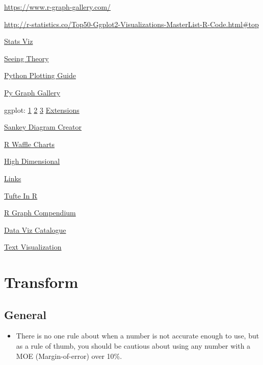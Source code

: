 \documentclass[]{book}
\providecommand{\tightlist}{%
  \setlength{\itemsep}{0pt}\setlength{\parskip}{0pt}}
\begin{document}
\url{https://www.r-graph-gallery.com/}

\url{http://r-statistics.co/Top50-Ggplot2-Visualizations-MasterList-R-Code.html\#top}

\href{http://emilkirkegaard.dk/understanding_statistics/}{Stats Viz}

\href{http://students.brown.edu/seeing-theory/}{Seeing Theory}

\href{http://pythonplot.com/}{Python Plotting Guide}

\href{https://python-graph-gallery.com}{Py Graph Gallery}

ggplot:
\href{https://www.pitt.edu/~naraehan/presentation/Graphs_and_Plots_using_Plotly.html}{1}
\textbar{} \href{https://plot.ly/python/table/}{2} \textbar{}
\href{https://plot.ly/python/html-reports/}{3} \textbar{}
\href{http://www.ggplot2-exts.org/gallery/}{Extensions}

\href{http://sankeymatic.com}{Sankey Diagram Creator}

\href{https://nsaunders.wordpress.com/2017/09/08/infographic-style-charts-using-the-r-waffle-package/}{R
Waffle Charts}

\href{https://research.googleblog.com/2016/12/open-sourcing-embedding-projector-tool.html}{High
Dimensional}

\href{http://www.thehackerwithin.org/swinburne/links.html}{Links}

\href{http://motioninsocial.com/tufte/}{Tufte In R}

\href{http://shinyapps.org/apps/RGraphCompendium/index.php}{R Graph
Compendium}

\href{http://www.datavizcatalogue.com/index.html}{Data Viz Catalogue}

\href{http://textvis.lnu.se/}{Text Visualization}

\section{Transform}\label{transform-1}

\subsection{General}\label{general-2}

\begin{itemize}
\tightlist
\item
  There is no one rule about when a number is not accurate enough to
  use, but as a rule of thumb, you should be cautious about using any
  number with a MOE (Margin-of-error) over 10\%.
\end{itemize}
\end{document}

